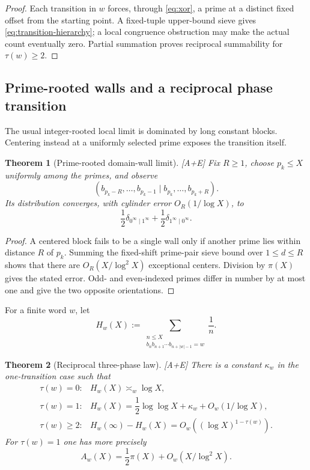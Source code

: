 \documentclass[11pt]{article}
\newtheorem{theorem}{Theorem}[section]
\theoremstyle{definition}
\theoremstyle{remark}
\newcommand{\status}[1]{\textnormal{\textcolor{accent}{\footnotesize[#1]}}}
\begin{document}
\begin{proof}
Each transition in $w$ forces, through \eqref{eq:xor}, a prime at a distinct fixed offset
from the starting point.  A fixed-tuple upper-bound sieve gives
\eqref{eq:transition-hierarchy}; a local congruence obstruction may make the actual count
eventually zero.  Partial summation proves reciprocal summability for
$\tau(w)\ge2$.
\end{proof}

\subsection{Prime-rooted walls and a reciprocal phase transition}

The usual integer-rooted local limit is dominated by long constant blocks.  Centering
instead at a uniformly selected prime exposes the transition itself.

\begin{theorem}[Prime-rooted domain-wall limit]\label{thm:prime-rooted-wall}
\status{A+E}
Fix $R\ge1$, choose $p_k\le X$ uniformly among the primes, and observe
\[
 (b_{p_k-R},\ldots,b_{p_k-1}\mid b_{p_k},\ldots,b_{p_k+R}).
\]
Its distribution converges, with cylinder error $O_R(1/\log X)$, to
\begin{equation}\label{eq:prime-rooted-wall}
 \frac12\delta_{0^\infty\mid1^\infty}
 +\frac12\delta_{1^\infty\mid0^\infty}.
\end{equation}
\end{theorem}

\begin{proof}
A centered block fails to be a single wall only if another prime lies within distance
$R$ of $p_k$.  Summing the fixed-shift prime-pair sieve bound over $1\le d\le R$
shows that there are $O_R(X/\log^2X)$ exceptional centers.  Division by $\pi(X)$
gives the stated error.  Odd- and even-indexed primes differ in number by at most one
and give the two opposite orientations.
\end{proof}

For a finite word $w$, let
\[
 H_w(X):=
 \sum_{\substack{n\le X\\b_nb_{n+1}\cdots b_{n+|w|-1}=w}}\frac1n.
\]

\begin{theorem}[Reciprocal three-phase law]\label{thm:reciprocal-three-phase}
\status{A+E}
There is a constant $\kappa_w$ in the one-transition case such that
\begin{equation}\label{eq:reciprocal-three-phase}
\begin{array}{ll}
 \tau(w)=0:&H_w(X)\asymp_w\log X,\\[1mm]
 \tau(w)=1:&H_w(X)=\dfrac12\log\log X+\kappa_w
                  +O_w(1/\log X),\\[2mm]
 \tau(w)\ge2:&H_w(\infty)-H_w(X)
                  =O_w((\log X)^{1-\tau(w)}).
\end{array}
\end{equation}
For $\tau(w)=1$ one has more precisely
\begin{equation}\label{eq:one-transition-count}
 A_w(X)=\frac12\pi(X)+O_w(X/\log^2X).
\end{equation}
\end{theorem}
\end{document}
